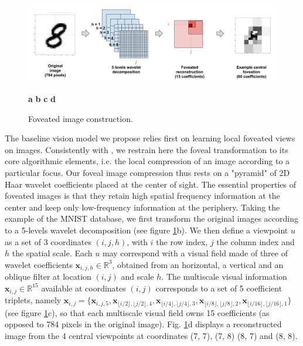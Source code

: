 \documentclass{article} %
\begin{document}
\begin{figure}[b!]
	\centerline{
		\includegraphics[width = \linewidth]{img/ICLR-foveated-model.png} 
	}
	\centerline{
		\hspace{2cm}
		\textbf{a}
		\hspace{4cm}
		\textbf{b}	
		\hspace{3cm}
		\textbf{c}
		\hspace{3cm}
		\textbf{d}
		\hspace{2cm}			
	}
	\caption{Foveated image construction.}\label{fig:foveated}
\end{figure}

The baseline vision model we propose relies first on learning local foveated views on images. %
Consistently with \cite{kortum1996implementation,wang2003foveation}, we restrain here the foveal transformation to its core algorithmic elements, i.e. the local compression of an image according to a particular focus. Our foveal image compression thus rests on a "pyramid" of 2D Haar wavelet coefficients placed at the center of sight. The essential properties of foveated images is that they retain high spatial frequency information at the center and keep only low-frequency information at the periphery. Taking the example of the MNIST database, we first transform the original images according to a 5-levels wavelet decomposition (see figure \ref{fig:foveated}b). We then define a viewpoint $u$ as a set of 3 coordinates $(i,j,h)$, with $i$ the row index, $j$ the column index and $h$ the spatial scale. Each $u$ may correspond with a visual field made of three of wavelet coefficients $\boldsymbol{x}_{i,j,h} \in \mathbb{R}^3$, obtained from an horizontal, a vertical and an oblique filter at location $(i,j)$ and scale $h$.  The multiscale visual information $\boldsymbol{x}_{i,j} \in \mathbb{R}^{15}$ available at coordinates $(i,j)$ corresponds to a set of 5 coefficient triplets, namely $\boldsymbol{x}_{i,j}=\{\boldsymbol{x}_{i,j,5}, \boldsymbol{x}_{\lfloor i/2\rfloor,\lfloor j/2\rfloor,4}, \boldsymbol{x}_{\lfloor i/4\rfloor,\lfloor j/4\rfloor,3}, \boldsymbol{x}_{\lfloor i/8\rfloor,\lfloor j/8\rfloor, 2}, \boldsymbol{x}_{\lfloor i/16\rfloor,\lfloor j/16\rfloor, 1}\}$ (see figure \ref{fig:foveated}c), so that each multiscale visual field owns 15 coefficients (as opposed to 784 pixels in the original image).
Fig. \ref{fig:foveated}d displays a reconstructed image from the 4 central viewpoints at coordinates (7, 7), (7, 8) (8, 7) and (8, 8).
\end{document}
